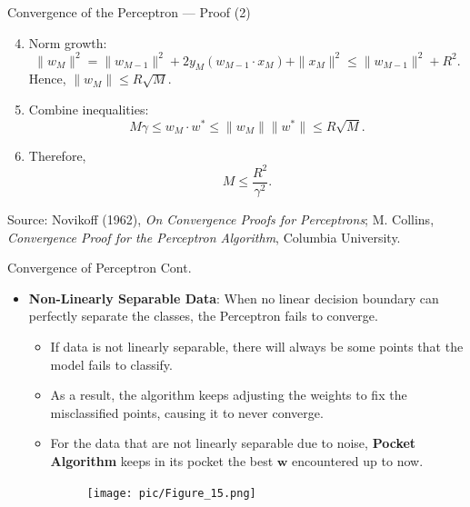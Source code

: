 \documentclass[serif, aspectratio=169]{beamer}
\begin{document}
    \begin{frame}{Convergence of the Perceptron — Proof (2)}

        \begin{enumerate}
            \setcounter{enumi}{3}
            \item Norm growth:
            \[
                \|w_M\|^2 = \|w_{M-1}\|^2 + 2y_M (w_{M-1}\cdot x_M) + \|x_M\|^2
                \le \|w_{M-1}\|^2 + R^2.
            \]
            Hence, $\|w_M\| \le R\sqrt{M}$.
            \item Combine inequalities:
            \[
                M\gamma \le w_M\cdot w^* \le \|w_M\| \|w^*\| \le R\sqrt{M}.
            \]
            \item Therefore,
            \[
                M \le \frac{R^2}{\gamma^2}.
            \]
        \end{enumerate}

        \vfill
        \footnotesize
        Source: Novikoff (1962), \textit{On Convergence Proofs for Perceptrons};
        M. Collins, \textit{Convergence Proof for the Perceptron Algorithm}, Columbia University.
    \end{frame}



    \begin{frame}{Convergence of Perceptron Cont.}
        \begin{itemize}\itemsep1.5em
        \item \textbf{Non-Linearly Separable Data}:
        When no linear decision boundary can perfectly separate the classes, the Perceptron fails to converge.
        \medskip
        \begin{itemize}\itemsep1em
        \item If data is not linearly separable, there will always be some points that the model fails to classify.
        \item As a result, the algorithm keeps adjusting the weights to fix the misclassified points, causing it to never converge.
        \item For the data that are not linearly separable due to noise, \textbf{Pocket Algorithm} keeps in its pocket the best \(\mathbf{w}\) encountered up to now.
        \endminipage
        \hspace{1.5cm}
        \begin{figure}
            \centering
            \texttt{[image: pic/Figure\_15.png]}
        \end{figure}
        \endminipage
        \end{itemize}
        \end{itemize}
        \vfill
    \end{frame}
\end{document}
